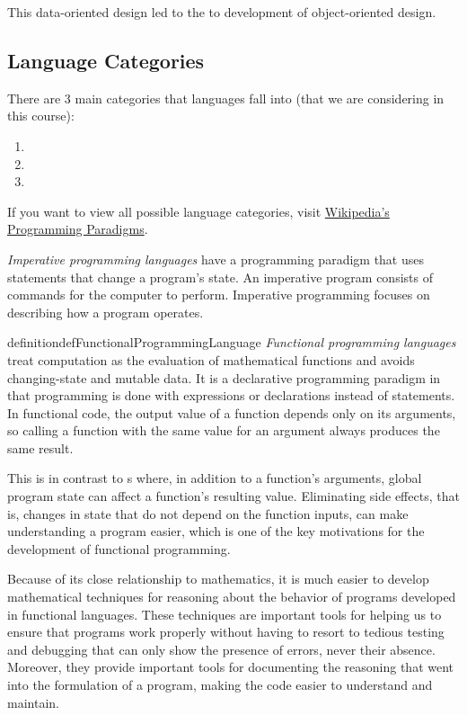 This data-oriented design led to the to development of object-oriented design.

\subsection{Language Categories}\label{subsec:Language_Categories}
There are 3 main categories that languages fall into (that we are considering in this course):
\begin{enumerate}[noitemsep]
\item {}
\item {}
\item {}
\end{enumerate}

If you want to view all possible language categories, visit \href{https://en.wikipedia.org/wiki/Programming_paradigm}{Wikipedia's Programming Paradigms}.

\begin{definition}\label{def:Imperative_Programming_Language}
  \emph{Imperative programming languages} have a programming paradigm that uses statements that change a program's state.
  An imperative program consists of commands for the computer to perform.
  Imperative programming focuses on describing how a program operates.
\end{definition}

\begin{restatable}{definition}{defFunctionalProgrammingLanguage}\label{def:Functional_Programming_Language}
  \emph{Functional programming languages} treat computation as the evaluation of mathematical functions and avoids changing-state and mutable data.
  It is a declarative programming paradigm in that programming is done with expressions or declarations instead of statements.
  In functional code, the output value of a function depends only on its arguments, so calling a function with the same value for an argument always produces the same result.

  This is in contrast to s where, in addition to a function's arguments, global program state can affect a function's resulting value.
  Eliminating side effects, that is, changes in state that do not depend on the function inputs, can make understanding a program easier, which is one of the key motivations for the development of functional programming.

  Because of its close relationship to mathematics, it is much easier to develop mathematical techniques for reasoning about the behavior of programs developed in functional languages.
  These techniques are important tools for helping us to ensure that programs work properly without having to resort to tedious testing and debugging that can only show the presence of errors, never their absence.
  Moreover, they provide important tools for documenting the reasoning that went into the formulation of a program, making the code easier to understand and maintain.
\end{restatable}

